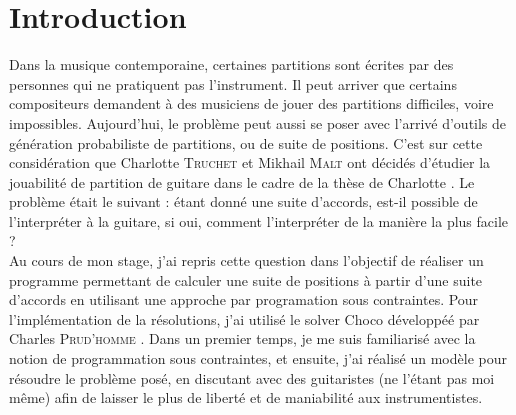 \section{Introduction}
\label{sec:Introduction}

Dans la musique contemporaine, certaines partitions sont écrites par des 
personnes qui ne pratiquent pas l'instrument. Il peut arriver que certains 
compositeurs demandent à des musiciens de jouer des partitions difficiles, 
voire impossibles. Aujourd'hui, le problème peut aussi se poser avec l'arrivé
d'outils de génération probabiliste de partitions, ou de suite de positions.
C'est sur cette considération que Charlotte \textsc{Truchet} et Mikhail 
\textsc{Malt} ont décidés d'étudier la jouabilité de partition de guitare dans
le cadre de la thèse de Charlotte \cite{CTThese}. Le problème était le 
suivant : étant donné une suite d'accords, est-il possible de l'interpréter à 
la guitare, si oui, comment l'interpréter de la manière la plus facile ?\\
Au cours de mon stage, j'ai repris cette question dans l'objectif de réaliser
un programme permettant de calculer une suite de positions à partir d'une suite
d'accords en utilisant une approche par programation sous contraintes. 
Pour l'implémentation de la résolutions, j'ai utilisé le solver Choco
développéé par Charles \textsc{Prud'homme} \cite{Choco}.
Dans un premier temps, je me suis familiarisé avec la notion de programmation
sous contraintes, et ensuite, j'ai réalisé un modèle pour résoudre le problème
posé, en discutant avec des guitaristes (ne l'étant pas moi même) afin de
laisser le plus de liberté et de maniabilité aux instrumentistes.
